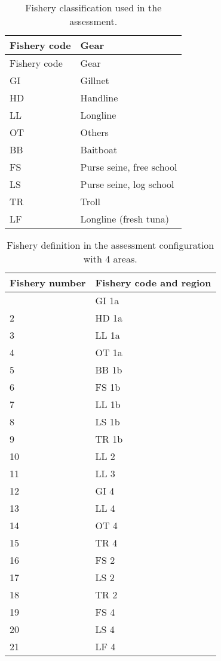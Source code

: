 \documentclass[
]{scrartcl}
\begin{document}
\newpage{}

\begin{longtable}[]{@{}ll@{}}
\caption{Fishery classification used in the
assessment.}\label{tbl-fishery-codes}\tabularnewline
\toprule\noalign{}
Fishery code & Gear \\
\midrule\noalign{}
\endfirsthead
\toprule\noalign{}
Fishery code & Gear \\
\midrule\noalign{}
\endhead
\bottomrule\noalign{}
\endlastfoot
GI & Gillnet \\
HD & Handline \\
LL & Longline \\
OT & Others \\
BB & Baitboat \\
FS & Purse seine, free school \\
LS & Purse seine, log school \\
TR & Troll \\
LF & Longline (fresh tuna) \\
\end{longtable}

\newpage{}

\begin{longtable}[]{@{}ll@{}}

\caption{\label{tbl-fleet-4A}Fishery definition in the assessment
configuration with 4 areas.}

\tabularnewline

\toprule\noalign{}
Fishery number & Fishery code and region \\
\midrule\noalign{}
\endhead
\bottomrule\noalign{}
\endlastfoot
1 & GI 1a \\
2 & HD 1a \\
3 & LL 1a \\
4 & OT 1a \\
5 & BB 1b \\
6 & FS 1b \\
7 & LL 1b \\
8 & LS 1b \\
9 & TR 1b \\
10 & LL 2 \\
11 & LL 3 \\
12 & GI 4 \\
13 & LL 4 \\
14 & OT 4 \\
15 & TR 4 \\
16 & FS 2 \\
17 & LS 2 \\
18 & TR 2 \\
19 & FS 4 \\
20 & LS 4 \\
21 & LF 4 \\

\end{longtable}
\end{document}
